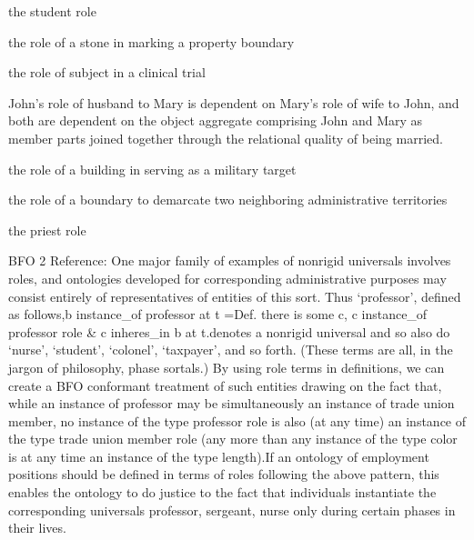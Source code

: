\documentclass[letterpaper,10pt,english]{sphinxmanual}
\begin{document}
\begin{sphinxShadowBox}

\sphinxAtStartPar
the student role

\sphinxAtStartPar
the role of a stone in marking a property boundary

\sphinxAtStartPar
the role of subject in a clinical trial

\sphinxAtStartPar
John’s role of husband to Mary is dependent on Mary’s role of wife to John, and both are dependent on the object aggregate comprising John and Mary as member parts joined together through the relational quality of being married.

\sphinxAtStartPar
the role of a building in serving as a military target

\sphinxAtStartPar
the role of a boundary to demarcate two neighboring administrative territories

\sphinxAtStartPar
the priest role
\end{sphinxShadowBox}

\begin{sphinxShadowBox}

\sphinxAtStartPar
BFO 2 Reference: One major family of examples of non\sphinxhyphen{}rigid universals involves roles, and ontologies developed for corresponding administrative purposes may consist entirely of representatives of entities of this sort. Thus ‘professor’, defined as follows,b instance\_of professor at t =Def. there is some c, c instance\_of professor role \& c inheres\_in b at t.denotes a non\sphinxhyphen{}rigid universal and so also do ‘nurse’, ‘student’, ‘colonel’, ‘taxpayer’, and so forth. (These terms are all, in the jargon of philosophy, phase sortals.) By using role terms in definitions, we can create a BFO conformant treatment of such entities drawing on the fact that, while an instance of professor may be simultaneously an instance of trade union member, no instance of the type professor role is also (at any time) an instance of the type trade union member role (any more than any instance of the type color is at any time an instance of the type length).If an ontology of employment positions should be defined in terms of roles following the above pattern, this enables the ontology to do justice to the fact that individuals instantiate the corresponding universals \textendash{}  professor, sergeant, nurse \textendash{} only during certain phases in their lives.
\end{sphinxShadowBox}
\end{document}
